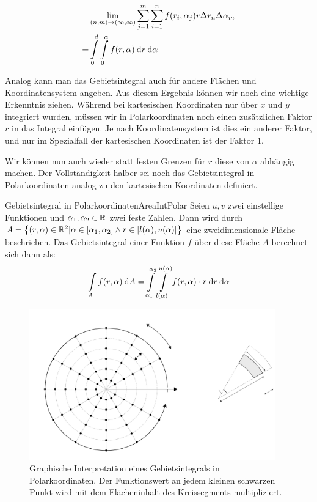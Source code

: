 \begin{center}
    \begin{alignat*}{1}
      & \lim\limits_{(n,m) \to (\infty, \infty)} \sum\limits_{j=1}^m \sum\limits_{i=1}^n f(r_i,\alpha_j) r \Delta r_n \Delta \alpha_m  \\
    = & \int\limits_0^d \int\limits_0^\alpha f(r, \alpha) \:\mathrm{d}{r} \:\mathrm{d}{\alpha}
    \end{alignat*}
\end{center}

Analog kann man das Gebietsintegral auch für andere Flächen und Koordinatensystem angeben. Aus diesem Ergebnis können wir noch eine wichtige Erkenntnis ziehen. Während bei kartesischen Koordinaten nur über $x$ und $y$ integriert wurden, müssen wir in Polarkoordinaten noch einen zusätzlichen Faktor $r$ in das Integral einfügen. Je nach Koordinatensystem ist dies ein anderer Faktor, und nur im Spezialfall der kartesischen Koordinaten ist der Faktor $1$.

Wir können nun auch wieder statt festen Grenzen für $r$ diese von $\alpha$ abhängig machen. Der Vollständigkeit halber sei noch das Gebietsintegral in Polarkoordinaten analog zu den kartesischen Koordinaten definiert.

\begin{definition}{Gebietsintegral in Polarkoordinaten}{AreaIntPolar}
    Seien $u,v$ zwei einstellige Funktionen und $\alpha_1,\alpha_2\in\mathbb{R}$ zwei feste Zahlen. Dann wird durch $A = \left\lbrace (r,\alpha) \in \mathbb{R}^2 | \alpha \in [\alpha_1,\alpha_2] \land r \in [l(\alpha), u(\alpha)] \right\rbrace$ eine zweidimensionale Fläche beschrieben. Das Gebietsintegral einer Funktion $f$ über diese Fläche $A$ berechnet sich dann als:
    $$
    \int\limits_{A} f(r,\alpha) \:\mathrm{d}{A} = \int\limits_{\alpha_1}^{\alpha_2} \int\limits_{l(\alpha)}^{u(\alpha)} f(r,\alpha) \cdot r \:\mathrm{d}{r} \:\mathrm{d}{\alpha}
    $$
\end{definition}

\begin{figure}
    \centering
    \includegraphics[width=0.95\textwidth]{./svg/integral-2d-polar}
    \caption[Gebietsintegral in Polarkoordinaten]{Graphische Interpretation eines Gebietsintegrals in Polarkoordinaten. Der Funktionswert an jedem kleinen schwarzen Punkt wird mit dem Flächeninhalt des Kreissegments multipliziert.}
    \label{fig:AreaIntegPolar}
\end{figure}

